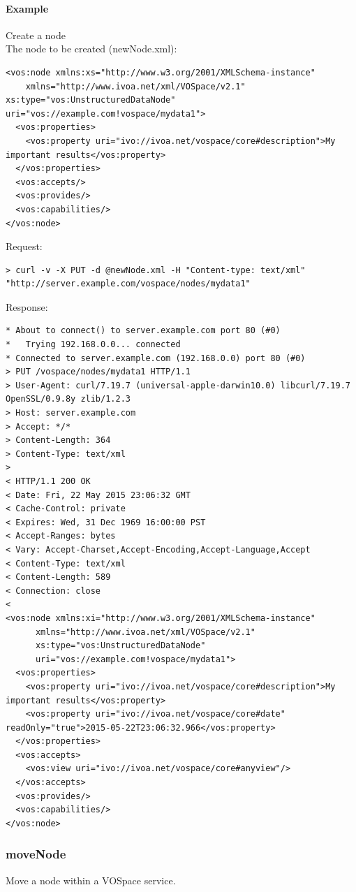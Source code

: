 \documentclass[11pt,a4paper]{ivoa}
\begin{document}
\paragraph{Example}
Create a node
\\[5px]
\noindent
The node to be created (newNode.xml):
\begin{lstlisting}
<vos:node xmlns:xs="http://www.w3.org/2001/XMLSchema-instance"
    xmlns="http://www.ivoa.net/xml/VOSpace/v2.1" xs:type="vos:UnstructuredDataNode" uri="vos://example.com!vospace/mydata1">
  <vos:properties>
    <vos:property uri="ivo://ivoa.net/vospace/core#description">My important results</vos:property>
  </vos:properties>
  <vos:accepts/>
  <vos:provides/>
  <vos:capabilities/>
</vos:node>
\end{lstlisting}
Request:
\begin{lstlisting}
> curl -v -X PUT -d @newNode.xml -H "Content-type: text/xml" "http://server.example.com/vospace/nodes/mydata1"
\end{lstlisting}
Response:
\begin{lstlisting}
* About to connect() to server.example.com port 80 (#0)
*   Trying 192.168.0.0... connected
* Connected to server.example.com (192.168.0.0) port 80 (#0)
> PUT /vospace/nodes/mydata1 HTTP/1.1
> User-Agent: curl/7.19.7 (universal-apple-darwin10.0) libcurl/7.19.7 OpenSSL/0.9.8y zlib/1.2.3
> Host: server.example.com
> Accept: */*
> Content-Length: 364
> Content-Type: text/xml
>
< HTTP/1.1 200 OK
< Date: Fri, 22 May 2015 23:06:32 GMT
< Cache-Control: private
< Expires: Wed, 31 Dec 1969 16:00:00 PST
< Accept-Ranges: bytes
< Vary: Accept-Charset,Accept-Encoding,Accept-Language,Accept
< Content-Type: text/xml
< Content-Length: 589
< Connection: close
<
<vos:node xmlns:xi="http://www.w3.org/2001/XMLSchema-instance"
      xmlns="http://www.ivoa.net/xml/VOSpace/v2.1"
      xs:type="vos:UnstructuredDataNode" 
      uri="vos://example.com!vospace/mydata1">
  <vos:properties>
    <vos:property uri="ivo://ivoa.net/vospace/core#description">My important results</vos:property>
    <vos:property uri="ivo://ivoa.net/vospace/core#date" readOnly="true">2015-05-22T23:06:32.966</vos:property>
  </vos:properties>
  <vos:accepts>
    <vos:view uri="ivo://ivoa.net/vospace/core#anyview"/>
  </vos:accepts>
  <vos:provides/>
  <vos:capabilities/>
</vos:node>
\end{lstlisting}

\subsubsection{moveNode}
\label{subsubsec:movenode}
Move a node within a VOSpace service.
\end{document}
